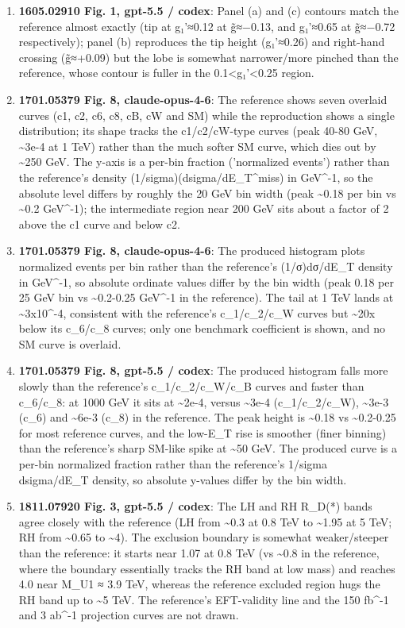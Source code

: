 \begin{enumerate}
\item \textbf{1605.02910 Fig. 1, gpt-5.5 / codex}: Panel (a) and (c) contours match the reference almost exactly (tip at g₁'≈0.12 at g̃≈−0.13, and g₁'≈0.65 at g̃≈−0.72 respectively); panel (b) reproduces the tip height (g₁'≈0.26) and right-hand crossing (g̃≈+0.09) but the lobe is somewhat narrower/more pinched than the reference, whose contour is fuller in the 0.1<g₁'<0.25 region.
\item \textbf{1701.05379 Fig. 8, claude-opus-4-6}: The reference shows seven overlaid curves (c1, c2, c6, c8, cB, cW and SM) while the reproduction shows a single distribution; its shape tracks the c1/c2/cW-type curves (peak 40-80 GeV, \textasciitilde{}3e-4 at 1 TeV) rather than the much softer SM curve, which dies out by \textasciitilde{}250 GeV. The y-axis is a per-bin fraction ('normalized events') rather than the reference's density (1/sigma)(dsigma/dE\_T\textasciicircum{}miss) in GeV\textasciicircum{}-1, so the absolute level differs by roughly the 20 GeV bin width (peak \textasciitilde{}0.18 per bin vs \textasciitilde{}0.2 GeV\textasciicircum{}-1); the intermediate region near 200 GeV sits about a factor of 2 above the c1 curve and below c2.
\item \textbf{1701.05379 Fig. 8, claude-opus-4-6}: The produced histogram plots normalized events per bin rather than the reference's (1/σ)dσ/dE\_T density in GeV\textasciicircum{}-1, so absolute ordinate values differ by the bin width (peak 0.18 per 25 GeV bin vs \textasciitilde{}0.2-0.25 GeV\textasciicircum{}-1 in the reference). The tail at 1 TeV lands at \textasciitilde{}3x10\textasciicircum{}-4, consistent with the reference's c\_1/c\_2/c\_W curves but \textasciitilde{}20x below its c\_6/c\_8 curves; only one benchmark coefficient is shown, and no SM curve is overlaid.
\item \textbf{1701.05379 Fig. 8, gpt-5.5 / codex}: The produced histogram falls more slowly than the reference's c\_1/c\_2/c\_W/c\_B curves and faster than c\_6/c\_8: at 1000 GeV it sits at \textasciitilde{}2e-4, versus \textasciitilde{}3e-4 (c\_1/c\_2/c\_W), \textasciitilde{}3e-3 (c\_6) and \textasciitilde{}6e-3 (c\_8) in the reference. The peak height is \textasciitilde{}0.18 vs \textasciitilde{}0.2-0.25 for most reference curves, and the low-E\_T rise is smoother (finer binning) than the reference's sharp SM-like spike at \textasciitilde{}50 GeV. The produced curve is a per-bin normalized fraction rather than the reference's 1/sigma dsigma/dE\_T density, so absolute y-values differ by the bin width.
\item \textbf{1811.07920 Fig. 3, gpt-5.5 / codex}: The LH and RH R\_D(*) bands agree closely with the reference (LH from \textasciitilde{}0.3 at 0.8 TeV to \textasciitilde{}1.95 at 5 TeV; RH from \textasciitilde{}0.65 to \textasciitilde{}4). The exclusion boundary is somewhat weaker/steeper than the reference: it starts near 1.07 at 0.8 TeV (vs \textasciitilde{}0.8 in the reference, where the boundary essentially tracks the RH band at low mass) and reaches 4.0 near M\_U1 ≈ 3.9 TeV, whereas the reference excluded region hugs the RH band up to \textasciitilde{}5 TeV. The reference's EFT-validity line and the 150 fb\textasciicircum{}-1 and 3 ab\textasciicircum{}-1 projection curves are not drawn.

\end{enumerate}
